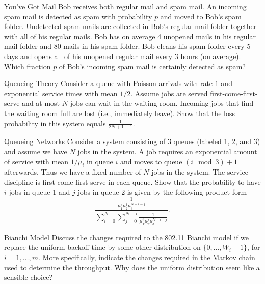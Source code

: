 
\begin{problem}{You've Got Mail}
Bob receives both regular mail and spam mail. An incoming
spam mail is detected as spam with probability $p$ and moved to Bob’s spam folder.
Undetected spam mails are collected in Bob’s regular mail folder together with all of his
regular mails. Bob has on average 4 unopened mails in his regular mail folder and 80
mails in his spam folder. Bob cleans his spam folder every 5 days and opens all of his
unopened regular mail every 3 hours (on average). Which fraction $p$ of Bob’s incoming
spam mail is certainly detected as spam?
\end{problem}

\begin{problem}{Queueing Theory}
Consider a queue with Poisson arrivals with rate $1$ and exponential
service times with mean $1/2$. Assume jobs are served first-come-first-serve and at most
$N$ jobs can wait in the waiting room. Incoming jobs that find the waiting room full
are lost (i.e., immediately leave). Show that the loss probability in this system equals
$\frac{1}{2N + 1 - 1}$.
\end{problem}

\begin{problem}{Queueing Networks}
Consider a system consisting of 3 queues (labeled 1, 2, and 3)
and assume we have $N$ jobs in the system. A job requires an exponential amount of
service with mean $1/\mu_i$ in queue $i$ and moves to queue $(i \mod 3) + 1$ afterwards. Thus
we have a fixed number of $N$ jobs in the system. The service discipline is first-come-first-serve in each queue. Show that the probability to have $i$ jobs in queue 1 and $j$ jobs
in queue 2 is given by the following product form
\[
\frac{\frac{1}{\mu_1^i \mu_2^j \mu_3^{N-i-j}}}{\sum_{i=0}^{N} \sum_{j=0}^{N-i} \frac{1}{\mu_1^i \mu_2^j \mu_3^{N-i-j}}}.
\]
\end{problem}

\begin{problem}{Bianchi Model}
Discuss the changes required to the 802.11 Bianchi model if we replace
the uniform backoff time by some other distribution on $\{0, \ldots, W_i -1\}$, for $i = 1, \ldots, m$.
More specifically, indicate the changes required in the Markov chain used to determine
the throughput. Why does the uniform distribution seem like a sensible choice?
\end{problem}
